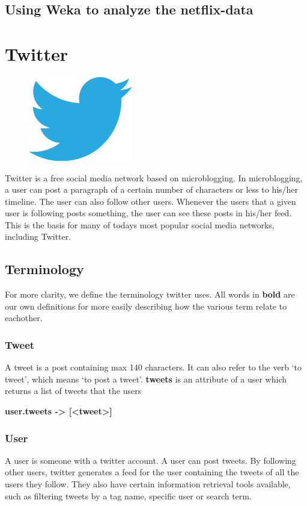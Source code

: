 \subsection{Using Weka to analyze the netflix-data}






\section{Twitter}\label{sec:twitter}

\begin{figure}
\vspace{-30pt}
\centering
\includegraphics[width = .25\textwidth]{image/twitter-logo.png}
\end{figure}
Twitter is a free social media network based on microblogging. In microblogging, a user can post a paragraph of a certain number of characters or less to his/her timeline. The user can also follow other users. Whenever the users that a given user is following posts something, the user can see these posts in his/her feed. This is the basis for many of todays most popular social media networks, including Twitter.

\subsection{Terminology}
For more clarity, we define the terminology twitter uses. All words in \textbf{bold} are our own definitions for more easily describing how the various term relate to eachother.

\subsubsection{Tweet}
A tweet is a post containing max 140 characters. It can also refer to the verb ‘to tweet’, which means ‘to post a tweet’. \textbf{tweets} is an attribute of a user which returns a list of tweets that the users

  \textbf{user.tweets -> [<tweet>]}
\subsubsection{User}
A user is someone with a twitter account. A user can post tweets. By following other users, twitter generates a feed for the user containing the tweets of all the users they follow. They also have certain information retrieval tools available, such as filtering tweets by a tag name, specific user or search term.

